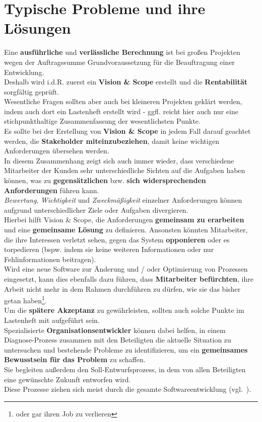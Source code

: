 \section{Typische Probleme und ihre Lösungen}

Eine \textbf{ausführliche} und \textbf{verlässliche Berechnung} ist bei großen Projekten wegen der Auftragssumme Grundvoraussetzung für die Beauftragung einer Entwicklung.\\

\noindent
Deshalb wird i.d.R. zuerst ein \textbf{Vision \& Scope} erstellt und die \textbf{Rentabilität} sorgfältig geprüft.\\

\noindent
Wesentliche Fragen sollten aber auch bei kleineren Projekten geklärt werden, indem auch dort ein Lastenheft erstellt wird - ggfl. reicht hier auch nur eine stichpunkthaltige Zusammenfassung der wesentlichsten Punkte.\\

\noindent
Es sollte bei der Erstellung von \textbf{Vision \& Scope} in jedem Fall darauf geachtet werden, die \textbf{Stakeholder miteinzubeziehen}, damit keine wichtigen Anforderungen übersehen werden.\\

\noindent
In diesem Zusammenhang zeigt sich auch immer wieder, dass verschiedene Mitarbeiter der Kunden sehr unterschiedliche Sichten auf die Aufgaben haben können, was zu \textbf{gegensätzlichen} bzw. \textbf{sich widersprechenden Anforderungen} führen kann.\\
\textit{Bewertung}, \textit{Wichtigkeit} und \textit{Zweckmäßigkeit} einzelner Anforderungen können aufgrund unterschiedlicher Ziele oder Aufgaben divergieren.\\
Hierbei hilft Vision \& Scope, die Anforderungen \textbf{gemeinsam zu erarbeiten} und eine \textbf{gemeinsame Lösung} zu definieren.
Ansonsten könnten Mitarbeiter, die ihre Interessen verletzt sehen, gegen das System \textbf{opponieren} oder es torpedieren (bspw. indem sie keine weiteren Informationen oder nur Fehlinformationen beitragen).\\

\noindent
Wird eine neue Software zur Änderung und / oder Optimierung von Prozessen eingesetzt, kann dies ebenfalls dazu führen, dass \textbf{Mitarbeiter befürchten}, ihre Arbeit nicht mehr in dem Rahmen durchführen zu dürfen, wie sie das bisher getan haben\footnote{oder gar ihren Job zu verlieren}.\\
Um die \textbf{spätere Akzeptanz} zu gewährleisten, sollten auch solche Punkte im Lastenheft mit aufgeführt sein.\\
Spezialisierte \textbf{Organisationsentwickler} können dabei helfen, in einem Diagnose-Prozess zusammen mit den Beteiligten die aktuelle Situation zu untersuchen und bestehende Probleme zu identifizieren, um ein \textbf{gemeinsames Bewusstsein für das Problem} zu schaffen.\\
Sie begleiten außerdem den Soll-Entwurfsprozess, in dem von allen Beteiligten eine gewünschte Zukunft entworfen wird.\\
Diese Prozesse ziehen sich meist durch die gesamte Softwareentwicklung (vgl.~\cite[53]{Wed09}).\\

